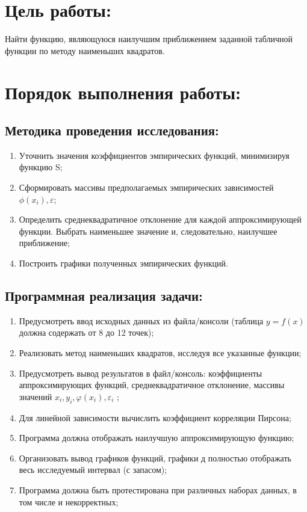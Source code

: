 \documentclass[12pt,one column]{article}
\begin{document}
\section{Цель работы:}
Найти функцию, являющуюся наилучшим приближением заданной табличной функции по методу наименьших квадратов.
\section{Порядок выполнения работы:}
\subsection{Методика проведения исследования:}
\begin{enumerate}
     меру отклонения: $S=\sum_{i=1}^n\left[\varphi (x_i)-y_i\right]^2$ для всех исследуемых функций;
    \item Уточнить значения коэффициентов эмпирических функций, минимизируя функцию S;
    \item Сформировать массивы предполагаемых эмпирических зависимостей $\phi(x_i), \varepsilon$;
    \item Определить среднеквадратичное отклонение для каждой аппроксимирующей функции. Выбрать наименьшее значение и, следовательно, наилучшее приближение;
    \item Построить графики полученных эмпирических функций.
\end{enumerate}
\subsection{Программная реализация задачи:}
\begin{enumerate}
    \item Предусмотреть ввод исходных данных из файла/консоли (таблица $y = f(x)$должна содержать от 8 до 12 точек);
    \item Реализовать метод наименьших квадратов, исследуя все указанные функции;
    \item Предусмотреть вывод результатов в файл/консоль: коэффициенты аппроксимирующих функций, среднеквадратичное отклонение, массивы значений $x_i, y_i, \varphi (x_i), \varepsilon_i$ ;
    \item Для линейной зависимости вычислить коэффициент корреляции Пирсона;
    \item Программа должна отображать наилучшую аппроксимирующую функцию;
    \item Организовать вывод графиков функций, графики д полностью отображать весь исследуемый интервал (с запасом);
    \item Программа должна быть протестирована при различных наборах данных, в том числе и некорректных;
\end{enumerate}
\end{document}

